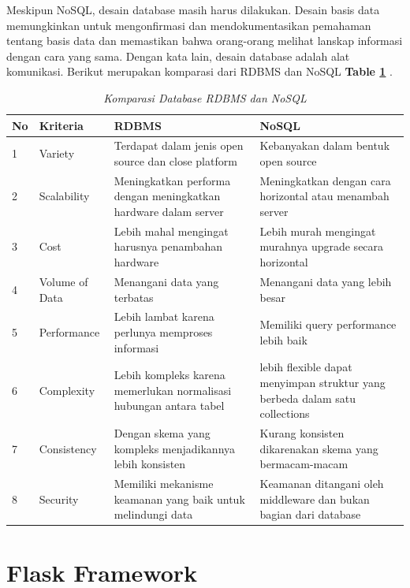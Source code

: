 	Meskipun NoSQL, desain database masih harus dilakukan. Desain basis data memungkinkan untuk mengonfirmasi dan mendokumentasikan pemahaman tentang basis data dan memastikan bahwa orang-orang melihat lanskap informasi dengan cara yang sama. Dengan kata lain, desain database adalah alat komunikasi. Berikut merupakan komparasi dari RDBMS dan NoSQL \textbf{Table \ref{table:komparasi_database}} \citep{Kunda2017ACS}.
	
	
\begin{table}[H]
	\centering
	\caption{\textit{Komparasi Database RDBMS dan NoSQL}}
	\label{table:komparasi_database}
	\begin{tabular}{@{} |p{0.5cm}|p{2cm}|p{5cm}|p{5cm}| @{}}
		\hline
		\textbf{No} & \textbf{Kriteria} & \textbf{RDBMS} & \textbf{NoSQL} \\
		\hline
		1 & Variety &  Terdapat dalam jenis open source dan close platform & Kebanyakan dalam bentuk open source\\
		\hline
		2 & Scalability &  Meningkatkan performa dengan meningkatkan hardware dalam server & Meningkatkan dengan cara horizontal atau menambah server\\
		\hline
		3 & Cost &  Lebih mahal mengingat harusnya penambahan hardware & Lebih murah mengingat murahnya upgrade secara horizontal \\
		\hline
		4 & Volume of Data &  Menangani data yang terbatas & Menangani data yang lebih besar\\
		\hline
		5 & Performance &  Lebih lambat karena perlunya memproses informasi  & Memiliki query performance lebih baik\\
		\hline
		6 & Complexity &  Lebih kompleks karena memerlukan normalisasi hubungan antara tabel & lebih flexible dapat menyimpan struktur yang berbeda dalam satu collections\\
		\hline
		7 & Consistency &  Dengan skema yang kompleks menjadikannya lebih konsisten & Kurang konsisten dikarenakan skema yang bermacam-macam\\
		\hline
		8 & Security &  Memiliki mekanisme keamanan yang baik untuk melindungi data & Keamanan ditangani oleh middleware dan bukan bagian dari database\\
		\hline
	\end{tabular}
\end{table}

\section{Flask Framework}

